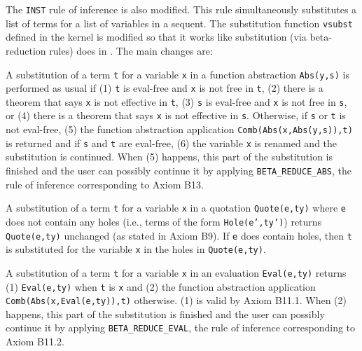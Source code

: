 \documentclass[fleqn]{llncs}
\begin{document}
The \texttt{INST} rule of inference is also modified.  This rule
simultaneously substitutes a list of terms for a list of variables in
a sequent.  The substitution function \texttt{vsubst} defined in the
{\HL} kernel is modified so that it works like substitution (via
beta-reduction  rules) does in {\churchqe}.  The main changes are:

\be

  \item A substitution of a term \texttt{t} for a variable \texttt{x}
    in a function abstraction \texttt{Abs(y,s)} is performed as usual
    if (1) \texttt{t} is eval-free and \texttt{x} is not free in
    \texttt{t}, (2) there is a theorem that says \texttt{x} is not
    effective in \texttt{t}, (3) \texttt{s} is eval-free and
    \texttt{x} is not free in \texttt{s}, or (4) there is a theorem
    that says \texttt{x} is not effective in \texttt{s}.  Otherwise,
    if \texttt{s} or \texttt{t} is not eval-free, (5) the function
    abstraction application \texttt{Comb(Abs(x,Abs(y,s)),t)} is
    returned and if \texttt{s} and \texttt{t} are eval-free, (6) the
    variable \texttt{x} is renamed and the substitution is continued.
    When (5) happens, this part of the substitution is finished and
    the user can possibly continue it by applying
    \texttt{BETA\_REDUCE\_ABS}, the rule of inference corresponding to
    Axiom B13.

  \item A substitution of a term \texttt{t} for a variable \texttt{x}
    in a quotation \texttt{Quote(e,ty)} where \texttt{e} does not
    contain any holes (i.e., terms of the form \texttt{Hole(e',ty')})
    returns \texttt{Quote(e,ty)} unchanged (as stated in Axiom B9).
    If \texttt{e} does contain holes, then \texttt{t} is substituted
    for the variable \texttt{x} in the holes in \texttt{Quote(e,ty)}.

  \item A substitution of a term \texttt{t} for a variable \texttt{x}
    in an evaluation \texttt{Eval(e,ty)} returns (1)
    \texttt{Eval(e,ty)} when \texttt{t} is \texttt{x} and (2) the
    function abstraction application
    \texttt{Comb(Abs(x,Eval(e,ty)),t)} otherwise.  (1) is valid by
    Axiom B11.1.  When (2) happens, this part of the substitution is
    finished and the user can possibly continue it by applying
    \texttt{BETA\_REDUCE\_EVAL}, the rule of inference corresponding
    to Axiom B11.2.

\ee
\end{document}
